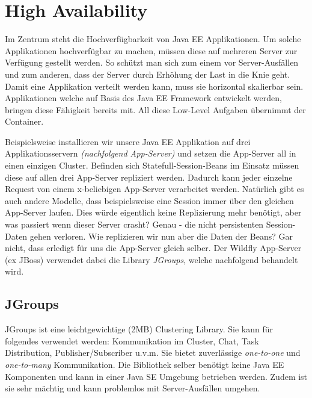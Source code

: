 \chapter{High Availability}
Im Zentrum steht die Hochverfügbarkeit von Java EE Applikationen. Um solche Applikationen hochverfügbar zu machen, müssen diese auf mehreren Server zur Verfügung gestellt werden. So schützt man sich zum einem vor Server-Ausfällen und zum anderen, dass der Server durch Erhöhung der Last in die Knie geht. Damit eine Applikation verteilt werden kann, muss sie horizontal skalierbar sein. Applikationen welche auf Basis des Java EE Framework entwickelt werden, bringen diese Fähigkeit bereits mit. All diese Low-Level Aufgaben übernimmt der Container.

Beispielsweise installieren wir unsere Java EE Applikation auf drei Applikationsservern \emph{(nachfolgend App-Server)} und setzen die App-Server all in einen einzigen Cluster. Befinden sich Statefull-Session-Beans im Einsatz müssen diese auf allen drei App-Server repliziert werden. Dadurch kann jeder einzelne Request von einem x-beliebigen App-Server verarbeitet werden. Natürlich gibt es auch andere Modelle, dass beispielsweise eine Session immer über den gleichen App-Server laufen. Dies würde eigentlich keine Replizierung mehr benötigt, aber was passiert wenn dieser Server crasht? Genau - die nicht persistenten Session-Daten gehen verloren. Wie replizieren wir nun aber die Daten der Beans? Gar nicht, dass erledigt für uns die App-Server gleich selber. Der Wildfly App-Server (ex JBoss) verwendet dabei die Library \emph{JGroups}, welche nachfolgend behandelt wird.

\section{JGroups}
JGroups ist eine leichtgewichtige (2MB) Clustering Library. Sie kann für folgendes verwendet werden: Kommunikation im Cluster, Chat, Task Distribution, Publisher/Subscriber u.v.m. Sie bietet zuverlässige \emph{one-to-one} und \emph{one-to-many} Kommunikation. Die Bibliothek selber benötigt keine Java EE Komponenten und kann in einer Java SE Umgebung betrieben werden. Zudem ist sie sehr mächtig und kann problemlos mit Server-Ausfällen umgehen.

